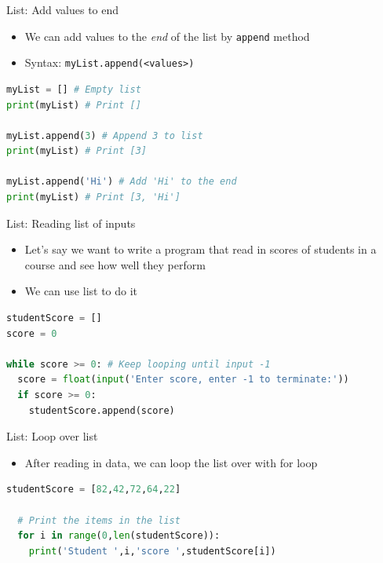\documentclass[10pt,xcolor={table,dvipsnames},t]{beamer}
\begin{document}
\begin{frame}[fragile]{List: Add values to end}
  \begin{itemize}
    \item We can add values to the \textit{end} of the list by \texttt{append} method
    \item Syntax: \texttt{myList.append(<values>)}
  \end{itemize}
\begin{lstlisting}[language=python]
myList = [] # Empty list
print(myList) # Print []

myList.append(3) # Append 3 to list
print(myList) # Print [3]

myList.append('Hi') # Add 'Hi' to the end 
print(myList) # Print [3, 'Hi']
\end{lstlisting}
\end{frame}

\begin{frame}[fragile]{List: Reading list of inputs}
  \begin{itemize}
    \item Let's say we want to write a program that read in scores of students in a course and see how well they perform
    \item We can use list to do it
  \end{itemize}
\begin{lstlisting}[language=python]
studentScore = []
score = 0

while score >= 0: # Keep looping until input -1
  score = float(input('Enter score, enter -1 to terminate:'))
  if score >= 0:
    studentScore.append(score)
\end{lstlisting}
\end{frame}

\begin{frame}[fragile]{List: Loop over list}
  \begin{itemize}
    \item After reading in data, we can loop the list over with for loop
  \end{itemize}
\begin{lstlisting}[language=python]
  studentScore = [82,42,72,64,22]

  # Print the items in the list
  for i in range(0,len(studentScore)):
    print('Student ',i,'score ',studentScore[i])
  
\end{lstlisting}
\end{frame}
\end{document}
